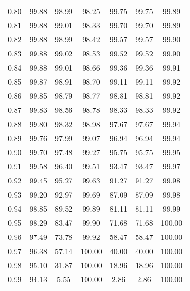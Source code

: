 \begin{tabular}{|c|c|c|c|c|c|c|}
      0.80 &     99.88 &     98.99 &      98.25 &   99.75 &      99.75 &         99.89 \\
      0.81 &     99.88 &     99.01 &      98.33 &   99.70 &      99.70 &         99.89 \\
      0.82 &     99.88 &     98.99 &      98.42 &   99.57 &      99.57 &         99.90 \\
      0.83 &     99.88 &     99.02 &      98.53 &   99.52 &      99.52 &         99.90 \\
      0.84 &     99.88 &     99.01 &      98.66 &   99.36 &      99.36 &         99.91 \\
      0.85 &     99.87 &     98.91 &      98.70 &   99.11 &      99.11 &         99.92 \\
      0.86 &     99.85 &     98.79 &      98.77 &   98.81 &      98.81 &         99.92 \\
      0.87 &     99.83 &     98.56 &      98.78 &   98.33 &      98.33 &         99.92 \\
      0.88 &     99.80 &     98.32 &      98.98 &   97.67 &      97.67 &         99.94 \\
      0.89 &     99.76 &     97.99 &      99.07 &   96.94 &      96.94 &         99.94 \\
      0.90 &     99.70 &     97.48 &      99.27 &   95.75 &      95.75 &         99.95 \\
      0.91 &     99.58 &     96.40 &      99.51 &   93.47 &      93.47 &         99.97 \\
      0.92 &     99.45 &     95.27 &      99.63 &   91.27 &      91.27 &         99.98 \\
      0.93 &     99.20 &     92.97 &      99.69 &   87.09 &      87.09 &         99.98 \\
      0.94 &     98.85 &     89.52 &      99.89 &   81.11 &      81.11 &         99.99 \\
      0.95 &     98.29 &     83.47 &      99.90 &   71.68 &      71.68 &        100.00 \\
      0.96 &     97.49 &     73.78 &      99.92 &   58.47 &      58.47 &        100.00 \\
      0.97 &     96.38 &     57.14 &     100.00 &   40.00 &      40.00 &        100.00 \\
      0.98 &     95.10 &     31.87 &     100.00 &   18.96 &      18.96 &        100.00 \\
      0.99 &     94.13 &      5.55 &     100.00 &    2.86 &       2.86 &        100.00 \\
\bottomrule
\end{tabular}
